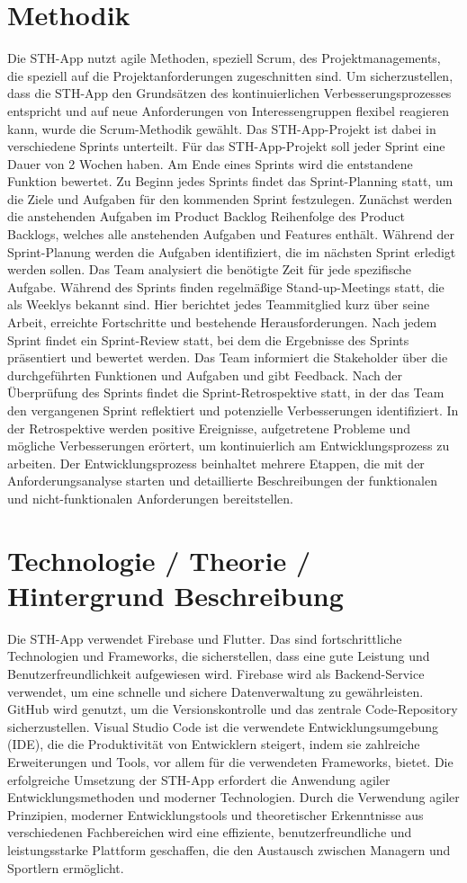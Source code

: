 \section{Methodik}
Die STH-App nutzt agile Methoden, speziell Scrum, des Projektmanagements, die speziell auf die Projektanforderungen zugeschnitten sind.
Um sicherzustellen, dass die STH-App den Grundsätzen des kontinuierlichen Verbesserungsprozesses entspricht und auf neue Anforderungen von Interessengruppen flexibel reagieren kann, wurde die Scrum-Methodik gewählt.
Das STH-App-Projekt ist dabei in verschiedene Sprints unterteilt.
Für das STH-App-Projekt soll jeder Sprint eine Dauer von 2 Wochen haben.
Am Ende eines Sprints wird die entstandene Funktion bewertet.
Zu Beginn jedes Sprints findet das Sprint-Planning statt, um die Ziele und Aufgaben für den kommenden Sprint festzulegen.
Zunächst werden die anstehenden Aufgaben im Product Backlog Reihenfolge des Product Backlogs, welches alle anstehenden Aufgaben und Features enthält.
Während der Sprint-Planung werden die Aufgaben identifiziert, die im nächsten Sprint erledigt werden sollen. Das Team analysiert die benötigte Zeit für jede spezifische Aufgabe.
Während des Sprints finden regelmäßige Stand-up-Meetings statt, die als Weeklys bekannt sind. Hier berichtet jedes Teammitglied kurz über seine Arbeit, erreichte Fortschritte und bestehende Herausforderungen.
Nach jedem Sprint findet ein Sprint-Review statt, bei dem die Ergebnisse des Sprints präsentiert und bewertet werden.
Das Team informiert die Stakeholder über die durchgeführten Funktionen und Aufgaben und gibt Feedback.
Nach der Überprüfung des Sprints findet die Sprint-Retrospektive statt, in der das Team den vergangenen Sprint reflektiert und potenzielle Verbesserungen identifiziert.
In der Retrospektive werden positive Ereignisse, aufgetretene Probleme und mögliche Verbesserungen erörtert, um kontinuierlich am Entwicklungsprozess zu arbeiten.
Der Entwicklungsprozess beinhaltet mehrere Etappen, die mit der Anforderungsanalyse starten und detaillierte Beschreibungen der funktionalen und nicht-funktionalen Anforderungen bereitstellen.
\section{Technologie / Theorie / Hintergrund Beschreibung}
Die STH-App verwendet Firebase und Flutter. Das sind fortschrittliche Technologien und Frameworks, die sicherstellen, dass eine gute Leistung und Benutzerfreundlichkeit aufgewiesen wird. Firebase wird als Backend-Service verwendet, um eine schnelle und sichere Datenverwaltung zu gewährleisten.
GitHub wird genutzt, um die Versionskontrolle und das zentrale Code-Repository sicherzustellen. Visual Studio Code ist die verwendete Entwicklungsumgebung (IDE), die die Produktivität von Entwicklern steigert, indem sie zahlreiche Erweiterungen und Tools, vor allem für die verwendeten Frameworks, bietet.
Die erfolgreiche Umsetzung der STH-App erfordert die Anwendung agiler Entwicklungsmethoden und moderner Technologien. Durch die Verwendung agiler Prinzipien, moderner Entwicklungstools und theoretischer Erkenntnisse aus verschiedenen Fachbereichen wird eine effiziente, benutzerfreundliche und leistungsstarke Plattform geschaffen, die den Austausch zwischen Managern und Sportlern ermöglicht.